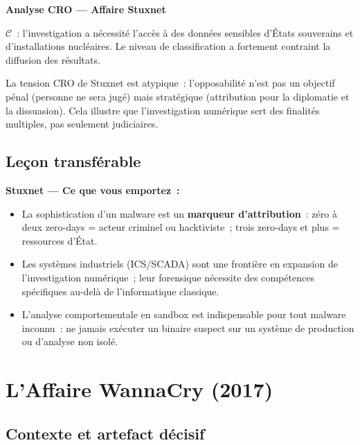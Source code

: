 \begin{boxCRO}
\textbf{Analyse CRO --- Affaire Stuxnet}

$\mathcal{C}$~: l'investigation a nécessité l'accès à des données sensibles
d'États souverains et d'installations nucléaires. Le niveau de
classification a fortement contraint la diffusion des résultats.

La tension CRO de Stuxnet est atypique~: l'opposabilité n'est pas un
objectif pénal (personne ne sera jugé) mais stratégique (attribution
pour la diplomatie et la dissuasion). Cela illustre que l'investigation
numérique sert des finalités multiples, pas seulement judiciaires.
\end{boxCRO}

\subsection{Leçon transférable}

\begin{boxresume}
\textbf{Stuxnet --- Ce que vous emportez~:}
\begin{itemize}
    \item La sophistication d'un malware est un \textbf{marqueur
          d'attribution}~: zéro à deux zero-days = acteur criminel ou
          hacktiviste~; trois zero-days et plus = ressources d'État.
    \item Les systèmes industriels (ICS/SCADA) sont une frontière en
          expansion de l'investigation numérique~; leur forensique
          nécessite des compétences spécifiques au-delà de l'informatique
          classique.
    \item L'analyse comportementale en sandbox est indispensable pour
          tout malware inconnu~: ne jamais exécuter un binaire suspect
          sur un système de production ou d'analyse non isolé.
\end{itemize}
\end{boxresume}

\section{L'Affaire WannaCry (2017)}
\label{sec:wannacry}

\subsection{Contexte et artefact décisif}

